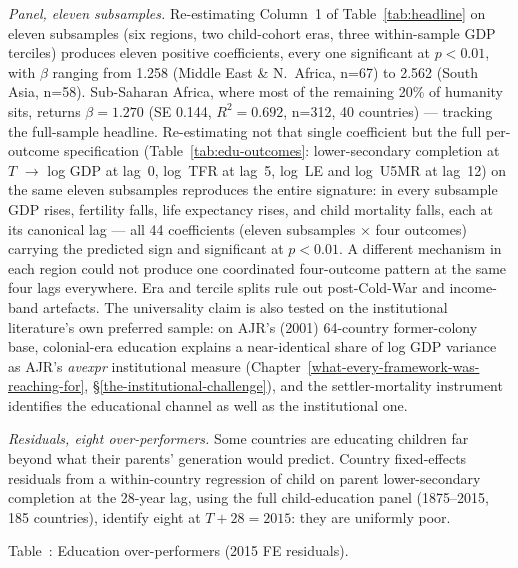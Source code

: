 \documentclass[12pt,letterpaper]{article}
\begin{document}
\emph{Panel, eleven subsamples.} Re-estimating Column~1 of
Table~\ref{tab:headline} on eleven subsamples (six regions, two
child-cohort eras, three within-sample GDP terciles) produces eleven
positive coefficients, every one significant at $p<0.01$, with $\beta$
ranging from 1.258 (Middle East \& N.~Africa, n=67) to 2.562 (South
Asia, n=58). Sub-Saharan Africa, where most of the remaining 20\% of
humanity sits, returns $\beta=1.270$ (SE 0.144, $R^2=0.692$, n=312,
40 countries) --- tracking the full-sample headline. Re-estimating not
that single coefficient but the full per-outcome specification
(Table~\ref{tab:edu-outcomes}: lower-secondary completion at $T$ $\to$
log GDP at lag~0, log~TFR at lag~5, log~LE and log~U5MR at lag~12) on the
same eleven subsamples reproduces the entire signature: in every
subsample GDP rises, fertility falls, life expectancy rises, and child
mortality falls, each at its canonical lag --- all 44 coefficients
(eleven subsamples $\times$ four outcomes) carrying the predicted sign
and significant at $p<0.01$. A different mechanism in each region could
not produce one coordinated four-outcome pattern at the same four lags
everywhere. Era and tercile
splits rule out post-Cold-War and income-band artefacts. The
universality claim is also tested on the institutional literature's
own preferred sample: on AJR's (2001) 64-country former-colony base,
colonial-era education explains a near-identical share of log GDP
variance as AJR's \emph{avexpr} institutional measure
(Chapter~\ref{what-every-framework-was-reaching-for},
\S\ref{the-institutional-challenge}), and the settler-mortality
instrument identifies the educational channel as well as the
institutional one.

\emph{Residuals, eight over-performers.} Some countries are educating
children far beyond what their parents' generation would predict.
Country fixed-effects residuals from a within-country regression of
child on parent lower-secondary completion at the 28-year lag, using
the full child-education panel (1875--2015, 185 countries), identify
eight at $T{+}28 = 2015$: they are uniformly poor.

\label{tab:over-performers}Table~\thetable: Education over-performers (2015 FE residuals).
\end{document}
